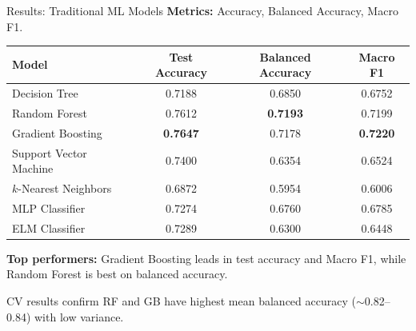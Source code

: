 \documentclass[aspectratio=169]{beamer}
\begin{document}
\begin{frame}{Results: Traditional ML Models}
\textbf{Metrics:} Accuracy, Balanced Accuracy, Macro F1.

\vspace{0.3cm}
\begin{table}[h]
\centering
\scriptsize
\begin{tabular}{@{}lccc@{}}
\toprule
\textbf{Model} & \textbf{Test Accuracy} & \textbf{Balanced Accuracy} & \textbf{Macro F1} \\
\midrule
Decision Tree & 0.7188 & 0.6850 & 0.6752 \\
Random Forest & 0.7612 & \textbf{0.7193} & 0.7199 \\
Gradient Boosting & \textbf{0.7647} & 0.7178 & \textbf{0.7220} \\
Support Vector Machine & 0.7400 & 0.6354 & 0.6524 \\
$k$-Nearest Neighbors & 0.6872 & 0.5954 & 0.6006 \\
MLP Classifier & 0.7274 & 0.6760 & 0.6785 \\
ELM Classifier & 0.7289 & 0.6300 & 0.6448 \\
\bottomrule
\end{tabular}
\end{table}

\vspace{0.2cm}
\textbf{Top performers:} Gradient Boosting leads in test accuracy and Macro F1, while Random Forest is best on balanced accuracy.

CV results confirm RF and GB have highest mean balanced accuracy ($\sim$0.82--0.84) with low variance.
\end{frame}
\end{document}
